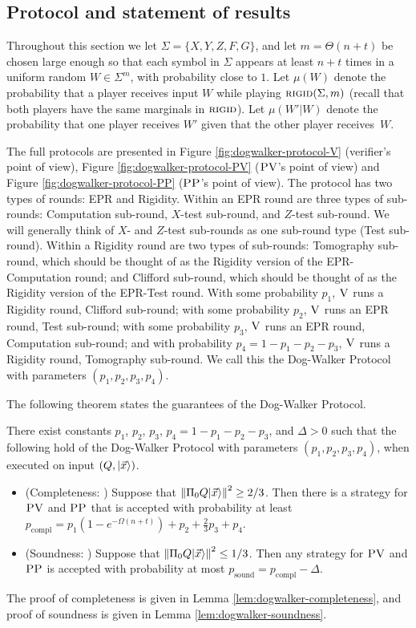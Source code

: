 
\subsection{Protocol and statement of results}


Throughout this section we 
let $\Sigma=\{X,Y,Z,F,G\}$, and let $m=\Theta(n+t)$ be chosen 
large enough so that each symbol in $\Sigma$ appears at least $n+t$ times in a uniform random $W\in\Sigma^m$, with probability close to $1$.
Let $\mu({W})$ denote the probability that a player receives input ${W}$ while playing $\textsc{rigid}(\Sigma,m)$ (recall that both players have the same marginals in $\textsc{rigid}$). Let $\mu({W}'|{W})$ denote the probability that one player receives ${W}'$ given that the other player receives~${W}$. 

The full protocols are presented in Figure \ref{fig:dogwalker-protocol-V} (verifier's point of view), Figure \ref{fig:dogwalker-protocol-PV} ($\textsc{PV}$'s point of view) and Figure \ref{fig:dogwalker-protocol-PP} ($\textsc{PP}$'s point of view). The protocol has two 
types of rounds: 
EPR and Rigidity. Within an EPR round are three 
types of sub-rounds: 
Computation sub-round, $X$-test sub-round, and $Z$-test sub-round. We will generally think of $X$- and $Z$-test sub-rounds as one sub-round type (Test sub-round). Within a Rigidity round are two types of sub-rounds: Tomography sub-round, which should be thought of as the Rigidity version of the EPR-Computation round; and Clifford sub-round, which should be thought of as the Rigidity version of the EPR-Test round. With some probability $p_1$, $\textsc{V}$ runs a Rigidity round, Clifford sub-round; with some probability $p_2$, $\textsc{V}$ runs an EPR round, Test sub-round; with some probability $p_3$, $\textsc{V}$ runs an EPR round, Computation sub-round; and with probability $p_4=1-p_1-p_2-p_3$, $\textsc{V}$ runs a Rigidity round, Tomography sub-round. We call this the Dog-Walker Protocol with parameters $(p_1,p_2,p_3,p_4)$.


The following theorem states the guarantees of the Dog-Walker Protocol.

\begin{theorem}\label{thm:dog-walker}
There exist constants $p_1$, $p_2$, $p_3$, $p_4=1-p_1-p_2-p_3$, and $\Delta>0$ such that the following hold of the Dog-Walker Protocol with parameters $(p_1,p_2,p_3,p_4)$, when executed on input $(Q,|\vec{x}\rangle)$.
\begin{itemize}
\item (Completeness: ) Suppose that $\left\|\Pi_0Q|\vec{x}\rangle\right\|^2\geq 2/3$. Then
  there is a strategy for $\textsc{PV}$ and $\textsc{PP}$ that is accepted with probability at
    least $p_{\mathrm{compl}}=p_1(1-e^{-\Omega(n+t)})+p_2+\frac{2}{3}p_3 +
    p_4$. 
\item (Soundness: ) Suppose that $\left\|\Pi_0Q|\vec{x}\rangle\right\|^2\leq 1/3$. Then any strategy for $\textsc{PV}$ and $\textsc{PP}$ is accepted with probability at most $p_{\mathrm{sound}}=p_{\mathrm{compl}}-\Delta$. 
\end{itemize}
\end{theorem}
\noindent The proof of completeness is given in Lemma \ref{lem:dogwalker-completeness}, and proof of soundness is given in Lemma \ref{lem:dogwalker-soundness}. 

